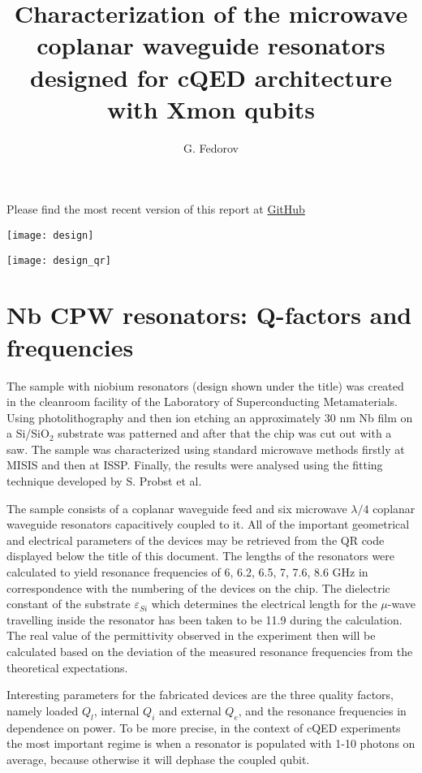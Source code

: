 \documentclass[12pt]{article}
\title{Characterization of the microwave coplanar waveguide resonators designed for cQED architecture with Xmon qubits}
\author{G. Fedorov}
\numberwithin{equation}{section}
\numberwithin{figure}{section}
\begin{document}
\maketitle

\begin{center}
Please find the most recent version of this report at \href{https://github.com/vdrhtc/Xmons/blob/master/Resonators/build/resonators.pdf}{GitHub}

\texttt{[image: design]}

\texttt{[image: design\_qr]}
\end{center}

\tableofcontents
\newpage

\section{Nb CPW resonators: Q-factors and frequencies}

The sample with niobium resonators (design shown under the title) was created in the cleanroom facility of the Laboratory of Superconducting Metamaterials. Using photolithography and then ion etching an approximately 30 nm Nb film on a Si/SiO$_2$ substrate was patterned and after that the chip was cut out with a saw. The sample was characterized using standard microwave methods firstly at MISIS and then at ISSP. Finally, the results were analysed using the fitting technique developed\cite{probst2015} by S. Probst et al.

The sample consists of a coplanar waveguide feed and six microwave $\lambda/4$ coplanar waveguide resonators capacitively coupled to it. All of the important geometrical and electrical parameters of the devices may be retrieved from the QR code displayed below the title of this document. The lengths of the resonators were calculated to yield resonance frequencies of 6, 6.2, 6.5, 7, 7.6, 8.6 GHz in correspondence with the numbering of the devices on the chip. The dielectric constant of the substrate $\varepsilon_{Si}$ which determines the electrical length for the $\mu$-wave travelling inside the resonator has been taken to be 11.9 during the calculation. The real value of the permittivity observed in the experiment then will be calculated based on the deviation of the measured resonance frequencies from the theoretical expectations.

Interesting parameters for the fabricated devices are the three quality factors, namely loaded $Q_l$, internal $Q_i$ and external $Q_e$, and the resonance frequencies in dependence on power. To be more precise, in the context of cQED experiments the most important regime is when a resonator is populated with 1-10 photons on average, because otherwise it will dephase the coupled qubit. 
\end{document}
